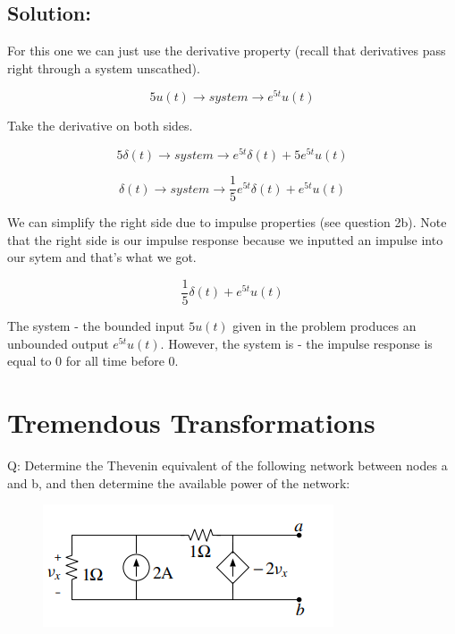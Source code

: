 \documentclass{article}
\begin{document}
\subsection{Solution:}

For this one we can just use the derivative property (recall that derivatives pass right through a system unscathed).

$$5u(t) \longrightarrow \boxed{system} \longrightarrow e^{5t}u(t)$$

Take the derivative on both sides.

$$5\delta(t) \longrightarrow \boxed{system} \longrightarrow e^{5t}\delta(t) + 5e^{5t}u(t)$$

$$\delta(t) \longrightarrow \boxed{system} \longrightarrow \frac{1}{5}e^{5t}\delta(t) + e^{5t}u(t)$$

We can simplify the right side due to impulse properties (see question 2b). Note that the right side is our impulse response because we inputted an impulse into our sytem and that's what we got.

$$\boxed{\frac{1}{5}\delta(t) + e^{5t}u(t)}$$

The system  - the bounded input $5u(t)$ given in the problem produces an unbounded output $e^{5t}u(t)$. However, the system is  - the impulse response is equal to 0 for all time before 0.

\vspace{3cm}

\section{Tremendous Transformations}

Q: Determine the Thevenin equivalent of the following network between nodes a and b, and then determine the available power of the network:
\vspace{-3mm}

\begin{figure}[h]
\begin{center}
    \includegraphics[width=0.4 
    \textwidth]{figures/qqqq.PNG}
\end{center}
\end{figure}
\end{document}
